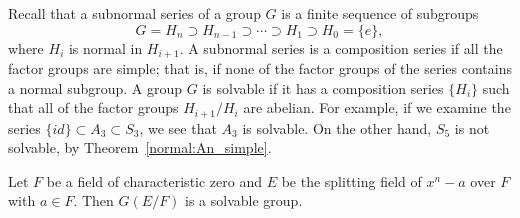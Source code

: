  

 
 
Recall that a subnormal series of a group $G$ is a finite sequence
of subgroups
\[
G = H_n \supset H_{n-1} \supset \cdots \supset H_1 \supset
H_0 = \{ e \},
\]
where $H_i$ is normal in $H_{i+1}$. A subnormal series is a composition 
series if all the factor groups are simple; that is, if none of the factor 
groups of the series contains a normal subgroup. A group $G$ is solvable 
if it has a composition series $\{ H_i \}$ such that all of the factor 
groups $H_{i+1} /H_i$ are abelian.  For example, if we examine the
series $\{ id \} \subset A_3 \subset S_3$, we see that $A_3$ is
solvable.  On the other hand, $S_5$ is not solvable, by Theorem~\ref{normal:An_simple}.
 
 

 
\begin{lemma}\label{galois:xn-a_solvable_lemma}
Let $F$ be a field of characteristic zero and $E$ be the splitting
field of $x^n - a$ over $F$ with $a \in F$. Then $G(E/F)$ is a
solvable group.  
\end{lemma}
 

